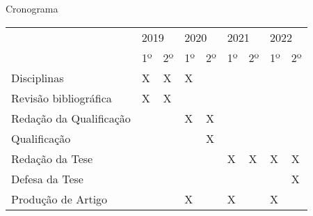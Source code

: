 \begin{frame}{Cronograma}
    \begin{table}[]
        \begin{tabular}{l|l|l|l|l|l|l|l|l|}
            \cline{2-9}
                                                          & \multicolumn{2}{l|}{2019} & \multicolumn{2}{l|}{2020} & \multicolumn{2}{l|}{2021} & \multicolumn{2}{l|}{2022} \\ \cline{2-9} 
                                                          & 1º          & 2º          & 1º          & 2º          & 1º          & 2º          & 1º          & 2º          \\ \hline
            \multicolumn{1}{|l|}{Disciplinas}             & X           & X           & X           &             &             &             &             &             \\ \hline
            \multicolumn{1}{|l|}{Revisão bibliográfica}   & X           & X           &             &             &             &             &             &             \\ \hline
            \multicolumn{1}{|l|}{Redação da Qualificação} &             &             & X           & X           &             &             &             &             \\ \hline
            \multicolumn{1}{|l|}{Qualificação}            &             &             &             & X           &             &             &             &             \\ \hline
            \multicolumn{1}{|l|}{Redação da Tese}         &             &             &             &             & X           & X           & X           & X           \\ \hline
            \multicolumn{1}{|l|}{Defesa da Tese}          &             &             &             &             &             &             &             & X           \\ \hline
            \multicolumn{1}{|l|}{Produção de Artigo}      &             &             & X           &             & X           &             & X           &             \\ \hline
        \end{tabular}
    \end{table}
\end{frame}